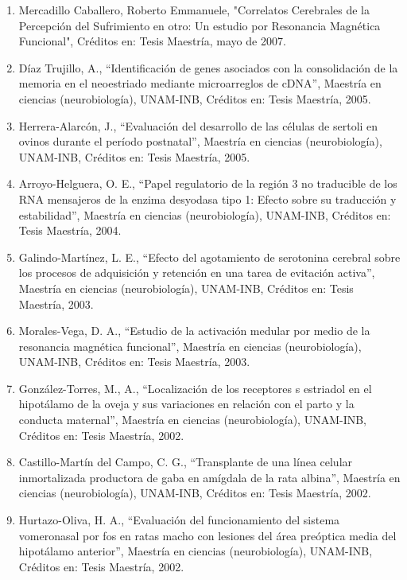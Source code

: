 \begin{enumerate}
\item Mercadillo Caballero, Roberto Emmanuele, "Correlatos Cerebrales de la Percepción del Sufrimiento en otro: Un estudio 
por Resonancia Magnética Funcional", Créditos en: Tesis Maestría, mayo de 2007.

\item Díaz Trujillo, A., “Identificación de genes asociados con la consolidación de la memoria en el neoestriado mediante 
microarreglos de cDNA”, Maestría en ciencias (neurobiología), UNAM-INB, Créditos en: Tesis Maestría, 2005.

\item Herrera-Alarcón, J., “Evaluación del desarrollo de las células de sertoli en ovinos durante el período postnatal”, 
Maestría en ciencias (neurobiología), UNAM-INB, Créditos en: Tesis Maestría, 2005.

\item Arroyo-Helguera, O. E., “Papel regulatorio de la región 3 no traducible de los RNA mensajeros de la enzima desyodasa 
tipo 1: Efecto sobre su traducción y estabilidad”, Maestría en ciencias (neurobiología), UNAM-INB, Créditos en: Tesis 
Maestría, 2004.

\item Galindo-Martínez, L. E., “Efecto del agotamiento de serotonina cerebral sobre los procesos de adquisición y retención 
en una tarea de evitación activa”, Maestría en ciencias (neurobiología), UNAM-INB, Créditos en: Tesis Maestría, 2003.

\item Morales-Vega, D. A., “Estudio de la activación medular por medio de la resonancia magnética funcional”, Maestría en 
ciencias (neurobiología), UNAM-INB, Créditos en: Tesis Maestría, 2003.

\item González-Torres, M., A., “Localización de los receptores s estriadol en el hipotálamo de la oveja y sus variaciones 
en 
relación con el parto y la conducta maternal”, Maestría en ciencias (neurobiología), UNAM-INB, Créditos en: Tesis Maestría, 
2002.

\item Castillo-Martín del Campo, C. G., “Transplante de una línea celular inmortalizada productora de gaba en amígdala de 
la 
rata albina”, Maestría en ciencias (neurobiología), UNAM-INB, Créditos en: Tesis Maestría, 2002.

\item Hurtazo-Oliva, H. A., “Evaluación del funcionamiento del sistema vomeronasal por fos en ratas macho con lesiones del 
área preóptica media del hipotálamo anterior”, Maestría en ciencias (neurobiología), UNAM-INB, Créditos en: Tesis Maestría, 
2002.


\end{enumerate}
